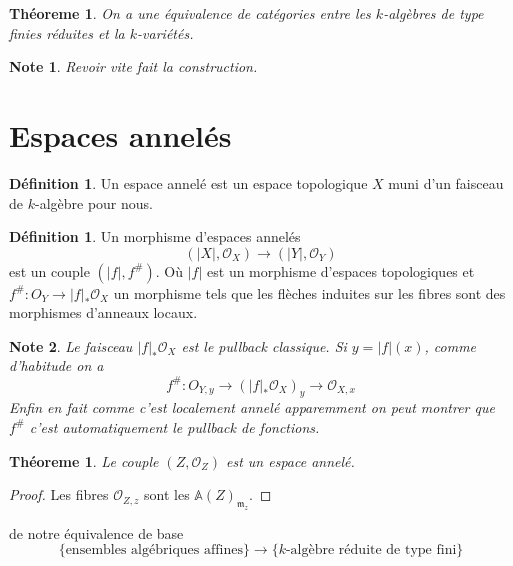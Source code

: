 \documentclass[a4paper,12pt]{book}
\newcommand{\A}{\mathbb{A}}
\newcommand{\Or}{\mathcal{O}}
\newcommand{\m}{\mathfrak{m}}
\theoremstyle{plain}
\newtheorem{thm}[subsection]{Théoreme}
\newtheorem{note}{Note}
\theoremstyle{definition}
\newtheorem{defn}[subsection]{Définition}
\theoremstyle{remark}
\begin{document}
\begin{thm}
    On a une équivalence de catégories entre les $k$-algèbres
    de type finies réduites et la $k$-variétés.
\end{thm}
\begin{note}
    Revoir vite fait la construction.
\end{note}
\section{Espaces annelés}
\begin{defn}
    Un espace annelé est un espace topologique $X$ muni d'un faisceau
    de $k$-algèbre pour nous.
\end{defn}

\begin{defn}
    Un morphisme d'espaces annelés 
    \[(|X|,\Or_X)\to (|Y|, \Or_Y)\] 
    est un couple $(|f|, f^{\#})$. Où 
    $|f|$ est un morphisme d'espaces topologiques et
    $f^{\#}\colon O_Y\to |f|_*\Or_X$
    un morphisme tels que les flèches induites sur 
    les fibres sont des morphismes d'anneaux 
    locaux.
\end{defn}
\begin{note}
    Le faisceau $|f|_*\Or_X$ est le pullback classique. Si
    $y=|f|(x)$, comme d'habitude on a 
    \[f^\#\colon O_{Y,y}\to (|f|_*\Or_X)_y\to \Or_{X,x}\]
    Enfin en fait comme c'est localement annelé apparemment on 
    peut montrer que $f^\#$ c'est automatiquement le pullback de 
    fonctions.
\end{note}
\begin{thm}
    Le couple $(Z,\Or_Z)$ est un espace annelé.
\end{thm}
\begin{proof}
    Les fibres $\Or_{Z,z}$ sont les $\A(Z)_{\m_z}$.
\end{proof}

de notre équivalence de base 
\[\{\textrm{ensembles algébriques affines}\}\to \{k\textrm{-algèbre réduite de type fini}\}\]
\end{document}
